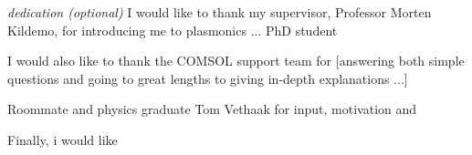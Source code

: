 \vspace*{7cm}
\begin{center}

\emph{dedication (optional)}
I would like to thank my supervisor, Professor Morten Kildemo, for introducing me to plasmonics ... PhD student


I would also like to thank the COMSOL support team for [answering both simple questions and going to great lengths to giving in-depth explanations ...]

Roommate and physics graduate Tom Vethaak for input, motivation and 

Finally, i would like 

\end{center}

\cleardoublepage